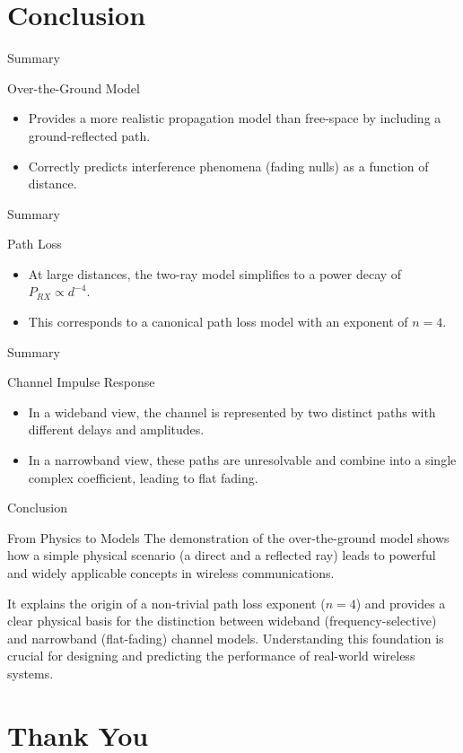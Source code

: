 \documentclass{beamer}
\begin{document}
	\section{Conclusion}
	
	\begin{frame}{Summary}
		\begin{block}{Over-the-Ground Model}
			\begin{itemize}
				\item Provides a more realistic propagation model than free-space by including a ground-reflected path.
				\item Correctly predicts interference phenomena (fading nulls) as a function of distance.
			\end{itemize}
		\end{block}
	\end{frame}
	
	\begin{frame}{Summary}
		\begin{block}{Path Loss}
			\begin{itemize}
				\item At large distances, the two-ray model simplifies to a power decay of $P_{RX} \propto d^{-4}$.
				\item This corresponds to a canonical path loss model with an exponent of $n=4$.
			\end{itemize}
		\end{block}
	\end{frame}
	
	\begin{frame}{Summary}
		\begin{block}{Channel Impulse Response}
			\begin{itemize}
				\item In a wideband view, the channel is represented by two distinct paths with different delays and amplitudes.
				\item In a narrowband view, these paths are unresolvable and combine into a single complex coefficient, leading to flat fading.
			\end{itemize}
		\end{block}
	\end{frame}
	
	\begin{frame}{Conclusion}
		\begin{alertblock}{From Physics to Models}
			The demonstration of the over-the-ground model shows how a simple physical scenario (a direct and a reflected ray) leads to powerful and widely applicable concepts in wireless communications.
			
			It explains the origin of a non-trivial path loss exponent ($n=4$) and provides a clear physical basis for the distinction between wideband (frequency-selective) and narrowband (flat-fading) channel models. Understanding this foundation is crucial for designing and predicting the performance of real-world wireless systems.
		\end{alertblock}
	\end{frame}
	
	\section{Thank You}
	
\end{document}
